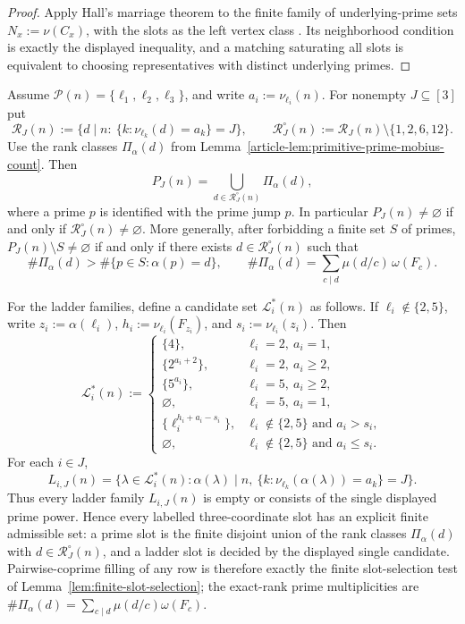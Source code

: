 \begin{proof}
Apply Hall's marriage theorem to the finite family of underlying-prime sets
$N_x:=\nu(C_x)$, with the slots as the left vertex class
\cite[Chapter~2]{LovaszPlummer1986MatchingTheory}. Its neighborhood condition
is exactly the displayed inequality, and a matching saturating all slots is
equivalent to choosing representatives with distinct underlying primes.
\end{proof}

\begin{lemma}
\label{lem:three-coordinate-arithmetic-tests}
Assume $\mathcal P(n)=\{\ell_1,\ell_2,\ell_3\}$, and write
$a_i:=\nu_{\ell_i}(n)$. For nonempty $J\subseteq[3]$ put
\[
\mathcal R_J(n):=\{d\mid n:\ \{k:\nu_{\ell_k}(d)=a_k\}=J\},
\qquad
\mathcal R_J^\circ(n):=\mathcal R_J(n)\setminus\{1,2,6,12\}.
\]
Use the rank classes $\Pi_\alpha(d)$ from
Lemma~\ref{article-lem:primitive-prime-mobius-count}.
Then
\[
P_J(n)=\bigcup_{d\in\mathcal R_J^\circ(n)}\Pi_\alpha(d),
\]
where a prime $p$ is identified with the prime jump $p$. In particular
$P_J(n)\ne\varnothing$ if and only if $\mathcal R_J^\circ(n)\ne\varnothing$.
More generally, after forbidding a finite set $S$ of primes,
$P_J(n)\setminus S\ne\varnothing$ if and only if there exists
$d\in\mathcal R_J^\circ(n)$ such that
\[
\#\Pi_\alpha(d)>
\#\{p\in S:\alpha(p)=d\},
\qquad
\#\Pi_\alpha(d)=\sum_{c\mid d}\mu(d/c)\,\omega(F_c).
\]

For the ladder families, define a candidate set $\mathcal L_i^*(n)$ as follows.
If $\ell_i\notin\{2,5\}$, write
$z_i:=\alpha(\ell_i)$, $h_i:=\nu_{\ell_i}(F_{z_i})$, and
$s_i:=\nu_{\ell_i}(z_i)$. Then
\[
\mathcal L_i^*(n):=
\begin{cases}
\{4\}, & \ell_i=2,\ a_i=1,\\
\{2^{a_i+2}\}, & \ell_i=2,\ a_i\ge2,\\
\{5^{a_i}\}, & \ell_i=5,\ a_i\ge2,\\
\varnothing, & \ell_i=5,\ a_i=1,\\
\{\ell_i^{h_i+a_i-s_i}\}, &
   \ell_i\notin\{2,5\}\text{ and }a_i>s_i,\\
\varnothing, &
   \ell_i\notin\{2,5\}\text{ and }a_i\le s_i .
\end{cases}
\]
For each $i\in J$,
\[
L_{i,J}(n)=
\{\lambda\in\mathcal L_i^*(n):\alpha(\lambda)\mid n,\ 
\{k:\nu_{\ell_k}(\alpha(\lambda))=a_k\}=J\}.
\]
Thus every ladder family $L_{i,J}(n)$ is empty or consists of the single
displayed prime power.  Hence every labelled three-coordinate slot has an
explicit finite admissible set: a prime slot is the finite disjoint union
of the rank classes $\Pi_\alpha(d)$ with
$d\in\mathcal R_J^\circ(n)$, and a ladder slot is decided by the displayed
single candidate.  Pairwise-coprime filling of any row is therefore exactly
the finite slot-selection test of Lemma~\ref{lem:finite-slot-selection}; the
exact-rank prime multiplicities are
$\#\Pi_\alpha(d)=\sum_{c\mid d}\mu(d/c)\omega(F_c)$.
\end{lemma}

